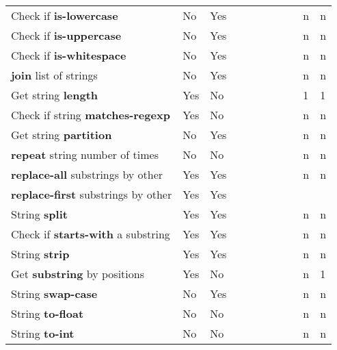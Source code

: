 \documentclass[anonymous,sigplan,review,11pt,nonacm,natbib=false]{acmart}
\begin{document}
\begin{longtable}{lllllllllll}
        Check if \textbf{is-lowercase} & No & Yes &  &  &  & &  &  & n & n \\

        Check if \textbf{is-uppercase} & No & Yes &  &  &  & &  &  & n & n \\

        Check if \textbf{is-whitespace} & No & Yes &  &  &  & &  &  & n & n \\

        \textbf{join} list of strings & No & Yes &  &  &  & &  &  & n & n \\

        Get string \textbf{length} & Yes & No &  &  &  & &  &  & 1 & 1 \\

        Check if string \textbf{matches-regexp} & Yes & No &  &  &  & &  &  & n & n \\

        Get string \textbf{partition} & No & Yes &  &  &  & &  &  & n & n \\

        \textbf{repeat} string number of times & No & No &  &  &  & &  &  & n & n \\

        \textbf{replace-all} substrings by other & Yes & Yes &  &  &  & &  &  & n & n \\

        \textbf{replace-first} substrings by other & Yes & Yes &  &  &  &  &  &  &  & \\

        String \textbf{split} & Yes & Yes &  &  &  & &  &  & n & n \\

        Check if \textbf{starts-with} a substring & Yes & Yes &  &  &  & &  &  & n & n \\

        String \textbf{strip} & Yes & Yes &  &  &  & &  &  & n & n \\

        Get \textbf{substring} by positions & Yes & No &  &  &  & &  &  & n & 1 \\

        String \textbf{swap-case} & No & Yes &  &  &  & &  &  & n & n \\

        String \textbf{to-float} & No & No &  &  &  & &  &  & n & n \\

        String \textbf{to-int} & No & No &  &  &  & &  &  & n & n \\


\end{longtable}
\end{document}
